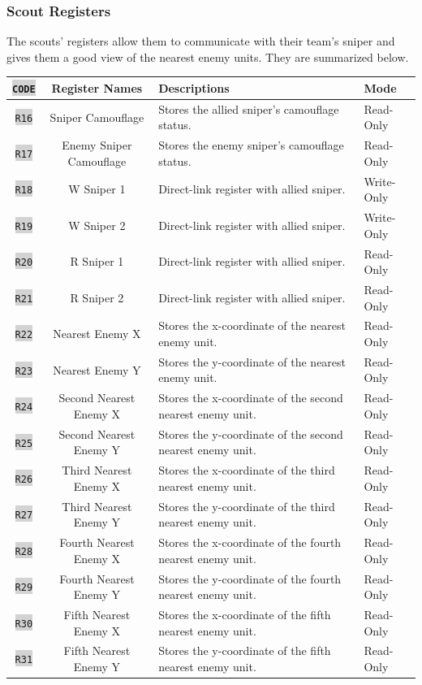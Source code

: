 \documentclass{article}
\newcommand{\vnscode}[1]{\colorbox{lightgray}{\lstinline[language=vns]{#1}}}
\begin{document}
\subsubsection{Scout Registers}

The scouts' registers allow them to communicate with their team's sniper and
gives them a good view of the nearest enemy units. They are summarized below.

\begin{minipage}{\textwidth}
\centering
\begin{tabular}{|c|c|l|l|}
    \hline \vnscode{CODE} & Register Names & Descriptions & Mode \\ \hline
    \vnscode{R16} & Sniper Camouflage & Stores the allied sniper's camouflage status. & Read-Only \\ \hline
    \vnscode{R17} & Enemy Sniper Camouflage & Stores the enemy sniper's camouflage status. & Read-Only \\ \hline
    \vnscode{R18} & W Sniper 1 & Direct-link register with allied sniper. & Write-Only \\ \hline
    \vnscode{R19} & W Sniper 2 & Direct-link register with allied sniper. & Write-Only \\ \hline
    \vnscode{R20} & R Sniper 1 & Direct-link register with allied sniper. & Read-Only \\ \hline
    \vnscode{R21} & R Sniper 2 & Direct-link register with allied sniper. & Read-Only \\ \hline
    \vnscode{R22} & Nearest Enemy X & Stores the x-coordinate of the nearest enemy unit. & Read-Only \\ \hline
    \vnscode{R23} & Nearest Enemy Y & Stores the y-coordinate of the nearest enemy unit. & Read-Only \\ \hline
    \vnscode{R24} & Second Nearest Enemy X & Stores the x-coordinate of the second nearest enemy unit. & Read-Only \\ \hline
    \vnscode{R25} & Second Nearest Enemy Y & Stores the y-coordinate of the second nearest enemy unit. & Read-Only \\ \hline
    \vnscode{R26} & Third Nearest Enemy X & Stores the x-coordinate of the third nearest enemy unit. & Read-Only \\ \hline
    \vnscode{R27} & Third Nearest Enemy Y & Stores the y-coordinate of the third nearest enemy unit. & Read-Only \\ \hline
    \vnscode{R28} & Fourth Nearest Enemy X & Stores the x-coordinate of the fourth nearest enemy unit. & Read-Only \\ \hline
    \vnscode{R29} & Fourth Nearest Enemy Y & Stores the y-coordinate of the fourth nearest enemy unit. & Read-Only \\ \hline
    \vnscode{R30} & Fifth Nearest Enemy X & Stores the x-coordinate of the fifth nearest enemy unit. & Read-Only \\ \hline
    \vnscode{R31} & Fifth Nearest Enemy Y & Stores the y-coordinate of the fifth nearest enemy unit. & Read-Only \\ \hline
\end{tabular}
\end{minipage}
\end{document}
